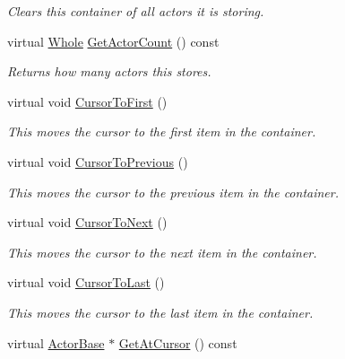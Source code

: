 \begin{DoxyCompactItemize}
\begin{DoxyCompactList}\small\item\em Clears this container of all actors it is storing. \item\end{DoxyCompactList}\item 
virtual \hyperlink{namespacephys_a460f6bc24c8dd347b05e0366ae34f34a}{Whole} \hyperlink{classphys_1_1ActorContainerVector_a6d2e5e68e23f5798ad10ba41e479d0f7}{GetActorCount} () const 
\begin{DoxyCompactList}\small\item\em Returns how many actors this stores. \item\end{DoxyCompactList}\item 
virtual void \hyperlink{classphys_1_1ActorContainerVector_ad9c2eb2a9405dcf687c86745afc9c031}{CursorToFirst} ()
\begin{DoxyCompactList}\small\item\em This moves the cursor to the first item in the container. \item\end{DoxyCompactList}\item 
virtual void \hyperlink{classphys_1_1ActorContainerVector_ac483bcdf348f55dc8b04a8805a002413}{CursorToPrevious} ()
\begin{DoxyCompactList}\small\item\em This moves the cursor to the previous item in the container. \item\end{DoxyCompactList}\item 
virtual void \hyperlink{classphys_1_1ActorContainerVector_a1c72366a6261d8e98dc0a9d2fad9f70f}{CursorToNext} ()
\begin{DoxyCompactList}\small\item\em This moves the cursor to the next item in the container. \item\end{DoxyCompactList}\item 
virtual void \hyperlink{classphys_1_1ActorContainerVector_aa6b08266bbb57a22c07ab50514e58db4}{CursorToLast} ()
\begin{DoxyCompactList}\small\item\em This moves the cursor to the last item in the container. \item\end{DoxyCompactList}\item 
virtual \hyperlink{classphys_1_1ActorBase}{ActorBase} $\ast$ \hyperlink{classphys_1_1ActorContainerVector_a280700490b368a963dd8feae044c7a6d}{GetAtCursor} () const 

\end{DoxyCompactItemize}
